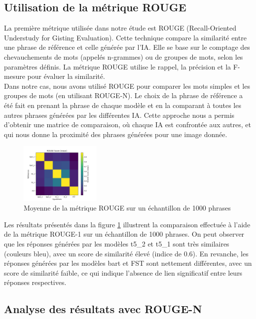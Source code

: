 \documentclass[conference]{IEEEtran}
\begin{document}
\subsection{Utilisation de la métrique ROUGE}

La première métrique utilisée dans notre étude est ROUGE (Recall-Oriented Understudy for Gisting Evaluation). Cette technique compare la similarité entre une phrase de référence et celle générée par l'IA. Elle se base sur le comptage des chevauchements de mots (appelés n-grammes) ou de groupes de mots, selon les paramètres définis. La métrique ROUGE utilise le rappel, la précision et la F-mesure pour évaluer la similarité.\\

Dans notre cas, nous avons utilisé ROUGE pour comparer les mots simples et les groupes de mots (en utilisant ROUGE-N). Le choix de la phrase de référence a été fait en prenant la phrase de chaque modèle et en la comparant à toutes les autres phrases générées par les différentes IA. Cette approche nous a permis d'obtenir une matrice de comparaison, où chaque IA est confrontée aux autres, et qui nous donne la proximité des phrases générées pour une image donnée.

\begin{figure}[ht!]
\centering
\includegraphics[width=0.35\textwidth]{images/rouge_score_mean_1000.png}
\caption{Moyenne de la métrique ROUGE sur un échantillon de 1000 phrases}
\label{fig}
\end{figure}

Les résultats présentés dans la figure \ref{fig} illustrent la comparaison effectuée à l'aide de la métrique ROUGE-1 sur un échantillon de 1000 phrases. On peut observer que les réponses générées par les modèles t5\_2 et t5\_1 sont très similaires (couleurs bleu), avec un score de similarité élevé (indice de 0.6). En revanche, les réponses générées par les modèles bart et FST sont nettement différentes, avec un score de similarité faible, ce qui indique l'absence de lien significatif entre leurs réponses respectives.

\subsection{Analyse des résultats avec ROUGE-N}
\end{document}

